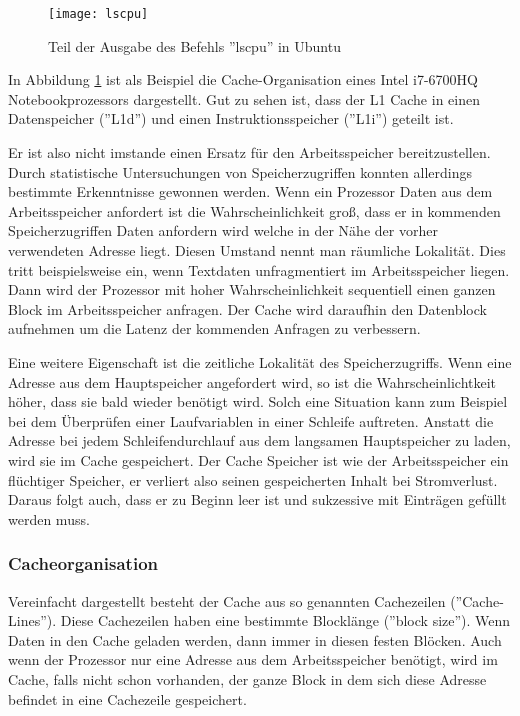 \documentclass[12pt]{article}
\begin{document}
\begin{figure}[!htb]
\centering
\texttt{[image: lscpu]}
\caption{Teil der Ausgabe des Befehls ''lscpu'' in Ubuntu}
\centering
\label{fig:lscpu}
\end{figure}

\noindent In Abbildung \ref{fig:lscpu} ist als Beispiel die Cache-Organisation eines Intel i7-6700HQ Notebookprozessors dargestellt. Gut zu sehen ist, dass der L1 Cache in einen Datenspeicher (''L1d'') und einen Instruktionsspeicher (''L1i'') geteilt ist. 

\noindent Er ist also nicht imstande einen Ersatz für den Arbeitsspeicher bereitzustellen. Durch statistische Untersuchungen von Speicherzugriffen konnten allerdings bestimmte Erkenntnisse gewonnen werden. Wenn ein Prozessor Daten aus dem Arbeitsspeicher anfordert ist die Wahrscheinlichkeit groß, dass er in kommenden Speicherzugriffen Daten anfordern wird welche in der Nähe der vorher verwendeten Adresse liegt. Diesen Umstand nennt man räumliche Lokalität. Dies tritt beispielsweise ein, wenn Textdaten unfragmentiert im Arbeitsspeicher liegen. Dann wird der Prozessor mit hoher Wahrscheinlichkeit sequentiell einen ganzen Block im Arbeitsspeicher anfragen. Der Cache wird daraufhin den Datenblock aufnehmen um die Latenz der kommenden Anfragen zu verbessern. 

\noindent Eine weitere Eigenschaft ist die zeitliche Lokalität des Speicherzugriffs. Wenn eine Adresse aus dem Hauptspeicher angefordert wird, so ist die Wahrscheinlichtkeit höher, dass sie bald wieder benötigt wird. Solch eine Situation kann zum Beispiel bei dem Überprüfen einer Laufvariablen in einer Schleife auftreten. Anstatt die Adresse bei jedem Schleifendurchlauf aus dem langsamen Hauptspeicher zu laden, wird sie im Cache gespeichert. 
Der Cache Speicher ist wie der Arbeitsspeicher ein flüchtiger Speicher, er verliert also seinen gespeicherten Inhalt bei Stromverlust. Daraus folgt auch, dass er zu Beginn leer ist und sukzessive mit Einträgen gefüllt werden muss.\cite[S.180-188]{mikroprozessortechnik2011}
\subsubsection{Cacheorganisation}
Vereinfacht dargestellt besteht der Cache aus so genannten Cachezeilen (''Cache-Lines''). Diese Cachezeilen haben eine bestimmte Blocklänge (''block size'')\cite[S.183]{mikroprozessortechnik2011}. Wenn Daten in den Cache geladen werden, dann immer in diesen festen Blöcken. Auch wenn der Prozessor nur eine Adresse aus dem Arbeitsspeicher benötigt, wird im Cache, falls nicht schon vorhanden, der ganze Block in dem sich diese Adresse befindet in eine Cachezeile gespeichert.
\end{document}
